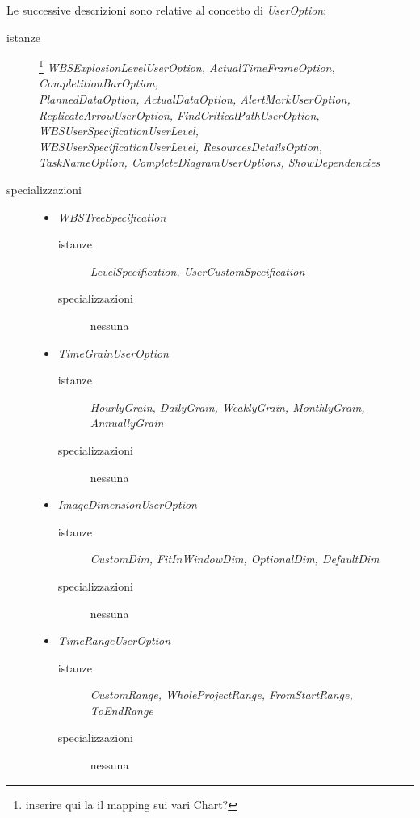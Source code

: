 Le successive descrizioni sono relative al concetto di \emph{UserOption}:
\begin{description}
  \item[istanze]\footnote{inserire qui la il mapping sui vari Chart?}
  \emph{WBSExplosionLevelUserOption, ActualTimeFrameOption, CompletitionBarOption, \\ PlannedDataOption, ActualDataOption,
  AlertMarkUserOption, ReplicateArrowUserOption, FindCriticalPathUserOption,
  WBSUserSpecificationUserLevel, \\WBSUserSpecificationUserLevel,
  ResourcesDetailsOption, TaskNameOption, CompleteDiagramUserOptions,
  ShowDependencies}
  \item[specializzazioni] \quad
  \begin{itemize}
    \item \emph{WBSTreeSpecification}
    \begin{description}
  \item[istanze] \emph{LevelSpecification, UserCustomSpecification}
  \item[specializzazioni] nessuna
\end{description}

\item \emph{TimeGrainUserOption}
    \begin{description}
  \item[istanze] \emph{HourlyGrain, DailyGrain, WeaklyGrain, MonthlyGrain,
  AnnuallyGrain}
  \item[specializzazioni] nessuna
\end{description}

\item \emph{ImageDimensionUserOption}
    \begin{description}
  \item[istanze] \emph{CustomDim, FitInWindowDim, OptionalDim, DefaultDim}
  \item[specializzazioni] nessuna
\end{description}

\item \emph{TimeRangeUserOption}
    \begin{description}
  \item[istanze] \emph{CustomRange, WholeProjectRange, FromStartRange, ToEndRange}
  \item[specializzazioni] nessuna
\end{description}

  \end{itemize}
\end{description}

